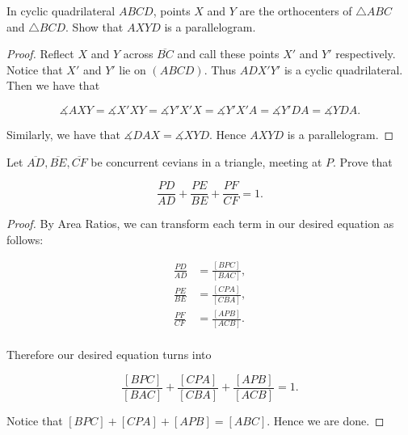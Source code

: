 \documentclass[letterpaper,oneside]{scrartcl}
\begin{document}
\begin{lemma*}
  [3.17]
  In cyclic quadrilateral $ABCD$, points $X$ and $Y$ are the orthocenters of $\triangle ABC$ and $\triangle BCD.$ Show that  $AXYD$ is a parallelogram.
\end{lemma*}

\begin{proof}  Reflect $X$ and $Y$ across $\overline{BC}$ and call these points $X'$ and $Y'$ respectively. Notice that $X'$ and $Y'$ lie on $({ABCD}).$ Thus ${ADX'Y'}$ is a cyclic quadrilateral. Then we have that

$$\measuredangle {AXY} = \measuredangle {X'XY}= \measuredangle {Y'X'X} = \measuredangle {Y'X'A} = \measuredangle {Y'DA} = \measuredangle {YDA}.$$

Similarly, we have that $\measuredangle {DAX} = \measuredangle {XYD}.$ Hence ${AXYD}$ is a parallelogram.
\end{proof}

\begin{problem*}
  [3.18]
  Let $\overline{AD}, \overline{BE}, \overline{CF}$ be concurrent cevians in a triangle, meeting at $P$. Prove that 
  
  $$\frac{PD}{AD} + \frac{PE}{BE} + \frac{PF}{CF} = 1.$$
\end{problem*}

\begin{proof}  By Area Ratios, we can transform each term in our desired equation as follows:

\begin{align*}
  \frac{PD}{AD} &= \frac{[BPC]}{[BAC]}, \\
  \frac{PE}{BE} &= \frac{[CPA]}{[CBA]}, \\
  \frac{PF}{CF} &= \frac{[APB]}{[ACB]}. \\
\end{align*}

Therefore our desired equation turns into

$$\frac{[BPC]}{[BAC]} + \frac{[CPA]}{[CBA]} +\frac{[APB]}{[ACB]} = 1.$$

Notice that $[{BPC}] + [{CPA}] + [{APB}] = [{ABC}].$ Hence we are done. \end{proof} 
\end{document}
